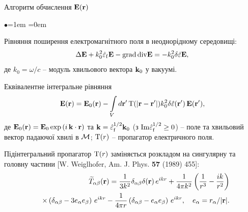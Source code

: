 \documentclass[10pt]{beamer}
\begin{document}
\begin{frame}{Алгоритм обчислення ${\bf E} ({\bf r})$}
\footnotesize

\begin{list}{$\bullet$}{\leftmargin=1em \itemindent=0em}



\item 
Рівняння поширення електромагнітного поля в неоднорідному середовищі:
\begin{equation} \label{eq:propogating_field}
\Delta {\bf E} + k_0^{2}\hat{\varepsilon}_{\rm f} {\bf E} - {\rm
grad}\, {\rm div} {\bf E} = - k_{0}^{2} \delta
\hat{\varepsilon} {\bf E},
\end{equation}
де $k_0=\omega/c$ -- модуль хвильового вектора ${\bf k}_0$ у вакуумі.


\item
Еквівалентне інтегральне рівняння
\begin{equation}\label{eq:propogating_field_integral} 
{\rm {\bf E}}({\rm {\bf r}}) = {\rm {\bf E}}_{0} ({\rm
{\bf r}}) - {\int\limits_{V} {d{\rm {\bf {r}'}}\,}} {\rm T}(|{\rm {\bf
r}}-{\rm {\bf {r}'}}|) k_{0}^{2} \delta \hat{\varepsilon} ({\rm
{\bf {r}'}})\,{\rm {\bf E}}({\rm {\bf {r}'}}),
\end{equation}
де ${\bf E}_0 ({\bf r}) = {\bf E}_0 \exp{(i\, {\bf k} \cdot{\bf r})}$ та ${\bf k} = \hat{\varepsilon}_{\rm f}^{1/2} {\bf k}_0$ (з ${\rm Im}{\hat{\varepsilon}_{\rm f}}^{1/2} \geq 0$) -- поле та хвильовий вектор падаючої хвилі в $\cal{M}$;
${\rm T}(r)$ -- пропагатор електричного поля. 

\item
Підінтегральний пропагатор ${\rm T}(r)$ заміняється розкладом на сингулярну та головну частини [W. Weiglhofer, Am. J. Phys. {\bf 57} (1989) 455]:
\begin{eqnarray}\label{eq:propog_representation} 
&&{\widetilde T}_{\alpha\beta} ({\rm {\bf
r}}) = \frac{1}{3k^{2}} \delta_{\alpha\beta} \delta ({\rm {\bf
r}})\,e^{ikr} + \frac{1}{4\pi k^{2}}
\left(\frac{1}{r^3}-\frac{ik}{r^2}\right)\nonumber\\
&&\times\left( \delta _{\alpha\beta} - 3e_{\alpha} e_{\beta}
\right)\,e^{ikr} - \frac{1}{4\pi r}\left( {\delta _{\alpha\beta} -
e_{\alpha} e_{\beta}} \right)\,e^{ikr},\quad 
e_\alpha = r_\alpha/|{\bf r}|.
\end{eqnarray}

\end{list}

\end{frame}
\end{document}
